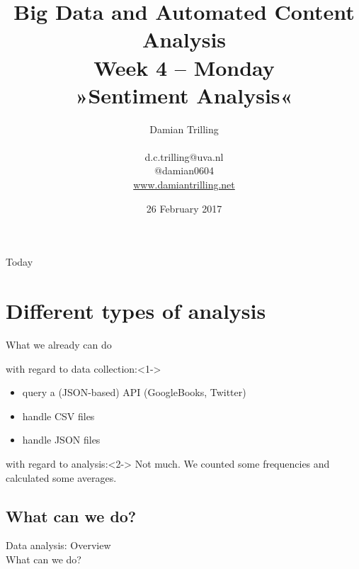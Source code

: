 \documentclass{beamer}
\begin{document}
\title[Big Data and Automated Content Analysis]{\textbf{Big Data and Automated Content Analysis} \\ Week 4 -- Monday \\ »Sentiment Analysis«}
\author[Damian Trilling]{Damian Trilling \\ ~ \\ \footnotesize{d.c.trilling@uva.nl \\@damian0604} \\ \url{www.damiantrilling.net}}
\date{26 February 2017}


\begin{frame}{}
\titlepage
\end{frame}

\begin{frame}{Today}
\tableofcontents
\end{frame}



\section{Different types of analysis}

\begin{frame}{What we already can do}
\begin{block}{with regard to data collection:}<1->
\begin{itemize}
\item query a (JSON-based) API (GoogleBooks, Twitter)
\item handle CSV files
\item handle JSON files 
\end{itemize}
\end{block}

\begin{block}{with regard to analysis:}<2->
Not much. We counted some frequencies and calculated some averages.
\end{block}

\end{frame}



\subsection{What can we do?}
\begin{frame}
Data analysis: Overview\\
What can we do? \\ ~\\
\end{frame}
\end{document}
